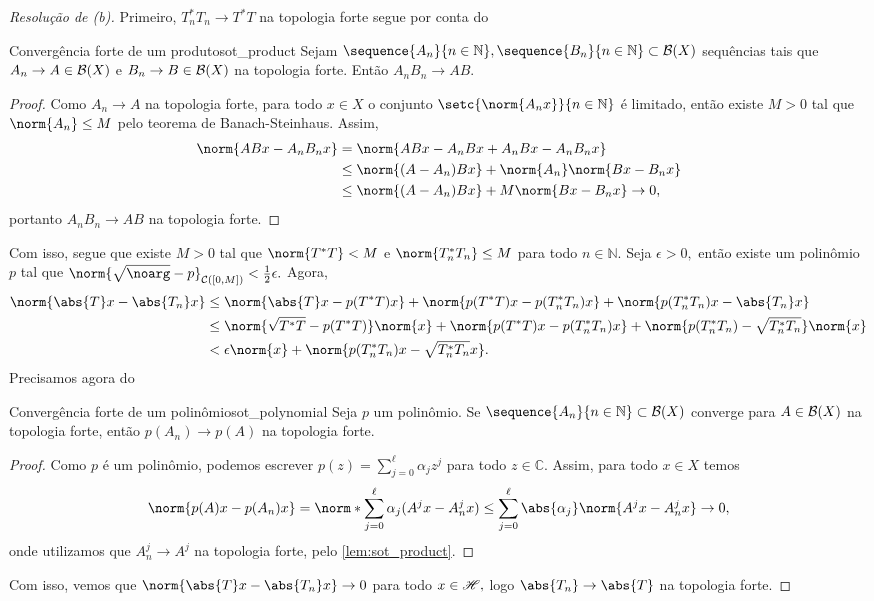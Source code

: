 \begin{proof}[Resolução de (b)]
  Primeiro, \(T_n^*T_n \to T^*T\) na topologia forte segue por conta do
  \begin{lemma}{Convergência forte de um produto}{sot_product}
    Sejam \(\sequence{A_n}{n\in\mathbb{N}}, \sequence{B_n}{n\in\mathbb{N}} \subset \bounded(X)\) sequências tais que \(A_n \to A \in \mathcal{B}(X)\) e \(B_n \to B\in\mathcal{B}(X)\) na topologia forte. Então \(A_nB_n \to AB.\)
  \end{lemma}
  \begin{proof}
    Como \(A_n\to A\) na topologia forte, para todo \(x \in X\) o conjunto \(\setc{\norm{A_nx}}{n\in\mathbb{N}}\) é limitado, então existe \(M > 0\) tal que \(\norm{A_n} \leq M\) pelo teorema de Banach-Steinhaus. Assim,
    \begin{align*}
      \norm{ABx - A_nB_nx} &= \norm{ABx - A_nBx + A_nBx - A_nB_nx}\\
                           &\leq \norm{(A-A_n)Bx} + \norm{A_n}\norm{Bx - B_nx}\\
                           &\leq \norm{(A-A_n)Bx} + M \norm{Bx - B_nx} \to 0,
    \end{align*}
    portanto \(A_nB_n \to AB\) na topologia forte.
  \end{proof}
  Com isso, segue que existe \(M > 0\) tal que \(\norm{T^*T} < M\) e \(\norm{T_n^*T_n} \leq M\) para todo \(n \in \mathbb{N}\). Seja \(\epsilon > 0,\) então existe um polinômio \(p\) tal que \(\norm{\sqrt{\noarg} - p}_{\mathcal{C}([0,M])} < \frac12\epsilon.\) Agora,
  \begin{align*}
    \norm{\abs{T}x - \abs{T_n}x} &\leq \norm{\abs{T}x - p(T^*T)x} + \norm{p(T^*T)x - p(T_n^*T_n)x} + \norm{p(T_n^*T_n)x - \abs{T_n}x}\\
                                 &\leq \norm{\sqrt{T^*T} - p(T^*T)}\norm{x} + \norm{p(T^*T)x - p(T_n^*T_n)x} + \norm{p(T_n^*T_n) - \sqrt{T_n^*T_n}}\norm{x}\\
                                 &< \epsilon \norm{x} + \norm{p(T_n^*T_n)x - \sqrt{T_n^*T_n}x}.
  \end{align*}
  Precisamos agora do
  \begin{lemma}{Convergência forte de um polinômio}{sot_polynomial}
    Seja \(p\) um polinômio. Se \(\sequence{A_n}{n\in\mathbb{N}} \subset \bounded(X)\) converge para \(A \in \mathcal{B}(X)\) na topologia forte, então \(p(A_n) \to p(A)\) na topologia forte.
  \end{lemma}
  \begin{proof}
    Como \(p\) é um polinômio, podemos escrever \(p(z) = \sum_{j = 0}^\ell \alpha_jz^j\) para todo \(z \in \mathbb{C}.\) Assim, para todo \(x \in X\) temos
    \begin{equation*}
      \norm{p(A)x - p(A_n)x} = \norm*{\sum_{j = 0}^\ell \alpha_j (A^jx - A_n^jx)} \leq \sum_{j = 0}^\ell \abs{\alpha_j} \norm{A^j x - A_n^jx} \to 0,
    \end{equation*}
    onde utilizamos que \(A_n^j\to A^j\) na topologia forte, pelo \cref{lem:sot_product}.
  \end{proof}
  Com isso, vemos que \(\norm{\abs{T}x - \abs{T_n}x} \to 0\) para todo \(x \in \mathscr{H},\) logo \(\abs{T_n} \to \abs{T}\) na topologia forte.
\end{proof}
